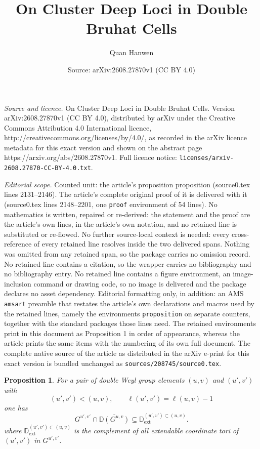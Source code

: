 \documentclass[10pt,a4paper]{amsart}
\title{On Cluster Deep Loci in Double Bruhat Cells}
\author{Quan Hanwen}
\date{Source: arXiv:2608.27870v1 (CC BY 4.0)}
\newtheorem{proposition}{Proposition}
\newcommand{\D}{\mathbb D}
\begin{document}
\maketitle

\noindent\emph{Source and licence.} On Cluster Deep Loci in Double Bruhat Cells. Version arXiv:2608.27870v1 (CC BY 4.0), distributed by arXiv under the Creative Commons Attribution 4.0 International licence, http://creativecommons.org/licenses/by/4.0/, as recorded in the arXiv licence metadata for this exact version and shown on the abstract page https://arxiv.org/abs/2608.27870v1. Full licence notice: \texttt{licenses/arxiv-2608.27870-CC-BY-4.0.txt}.\par\smallskip

\noindent\textit{Editorial scope.} Counted unit: the article's proposition proposition (source0.tex lines 2131--2146). The article's complete original proof of it is delivered with it (source0.tex lines 2148--2201, one \texttt{proof} environment of 54 lines). No mathematics is written, repaired or re-derived: the statement and the proof are the article's own lines, in the article's own notation, and no retained line is substituted or re-flowed.  No further source-local context is needed: every cross-reference of every retained line resolves inside the two delivered spans.  Nothing was omitted from any retained span, so the package carries no omission record.  No retained line contains a citation, so the wrapper carries no bibliography and no bibliography entry.  No retained line contains a figure environment, an image-inclusion command or drawing code, so no image is delivered and the package declares no asset dependency.  Editorial formatting only, in addition: an AMS \texttt{amsart} preamble that restates the article's own declarations and macros used by the retained lines, namely the environments \texttt{proposition} on separate counters, together with the standard packages those lines need.  The retained environments print in this document as Proposition 1 in order of appearance, whereas the article prints the same items with the numbering of its own full document.  The complete native source of the article as distributed in the arXiv e-print for this exact version is bundled unchanged as \texttt{sources/208745/source0.tex}.
\begin{proposition}
   For a pair of double Weyl group elements $(u,v)$ and $(u',v')$ with
\[
(u',v') < (u,v),\qquad \ell(u',v')=\ell(u,v)-1
\]
one has
\[
G^{u',v'}
\cap
\overline{\D(G^{u,v})}
\subseteq
\D_{\mathrm{ext}}^{(u',v')\subset(u,v)}.
\]
where $\D_{\mathrm{ext}}^{(u',v')\subset(u,v)}$ is the complement of all extendable coordinate tori of $(u',v')$ in $G^{u',v'}$.

\end{proposition}
\end{document}
